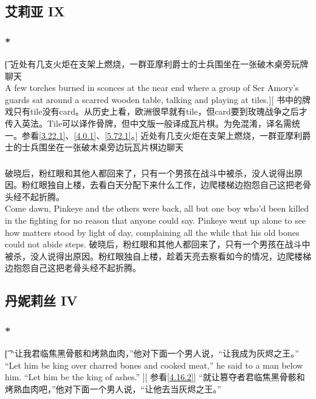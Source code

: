 \documentclass[12pt,a4paper]{article}
\begin{document}
\subsection{艾莉亚 IX}
\subsubsection{\color{red}*}\label{2.47.1}\t[
	近处有几支火炬在支架上燃烧，一群亚摩利爵士的士兵围坐在一张破木桌旁玩牌聊天\\
	A few torches burned in sconces at the near end where a group of Ser Amory's guards sat around a scarred wooden table, talking and playing at tiles.][
	书中的牌戏只有tile没有card。从历史上看，欧洲很早就有tile，但card要到玫瑰战争之后才传入英法。Tile可以译作骨牌，但中文版一般译成瓦片棋。为免混淆，译名需统一。参看\ref{3.22.1}、\ref{4.0.1}、\ref{5.72.1}。]
	近处有几支火炬在支架上燃烧，一群亚摩利爵士的士兵围坐在一张破木桌旁边玩瓦片棋边聊天


\subsubsection{}\color{blue}
	破晓后，粉红眼和其他人都回来了，只有一个男孩在战斗中被杀，没人说得出原因。粉红眼独自上楼，去看白天分配下来什么工作，边爬楼梯边抱怨自己这把老骨头经不起折腾。\\
	Come dawn, Pinkeye and the others were back, all but one boy who'd been killed in the fighting for no reason that anyone could say. Pinkeye went up alone to see how matters stood by light of day, complaining all the while that his old bones could not abide steps. \color{black}
	破晓后，粉红眼和其他人都回来了，只有一个男孩在战斗中被杀，没人说得出原因。粉红眼独自上楼，趁着天亮去察看如今的情况，边爬楼梯边抱怨自己这把老骨头经不起折腾。
	
\subsection{丹妮莉丝 IV}
\subsubsection{\color{red}*}\label{2.48.1}\t[
	“让我君临焦黑骨骸和烤熟血肉，”他对下面一个男人说，“让我成为灰烬之王。”\\
	“Let him be king over charred bones and cooked meat,” he said to a man below him. “Let him be the king of ashes.” ][
	参看\ref{4.16.2}]
	“就让篡夺者君临焦黑骨骸和烤熟血肉吧，”他对下面一个男人说，“让他去当灰烬之王。”
	
\end{document}
